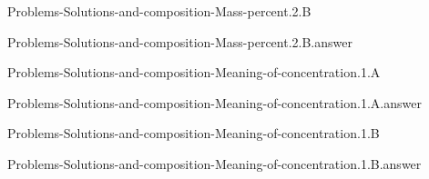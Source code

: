 \documentclass[main.tex]{subfiles}
\newcommand\chapterlabel{}
\begin{document}
\renewcommand\chapterlabel{Ch-electrolytes}
\begin{question}[ID=\the\value{numA}]
{Problems-Solutions-and-composition-Mass-percent.2.B}
\end{question}
   \begin{Form}
   \TextField[multiline,backgroundcolor=gray!20,borderwidth=0,width=0.43\textwidth  ,height=115pt, name=\the\value{numA}]  { }\end{Form}
\begin{solution}
{Problems-Solutions-and-composition-Mass-percent.2.B.answer}
\hspace{0.1cm}
\end{solution}


\renewcommand\chapterlabel{Ch-electrolytes}
\begin{question}[ID=\the\value{numA}]
{Problems-Solutions-and-composition-Meaning-of-concentration.1.A}
\end{question}
   \begin{Form}
   \TextField[multiline,backgroundcolor=gray!20,borderwidth=0,width=0.43\textwidth  ,height=115pt, name=\the\value{numA}]  { }\end{Form}
\begin{solution}
{Problems-Solutions-and-composition-Meaning-of-concentration.1.A.answer}
\hspace{0.1cm}
\end{solution}


\renewcommand\chapterlabel{Ch-electrolytes}
\begin{question}[ID=\the\value{numA}]
{Problems-Solutions-and-composition-Meaning-of-concentration.1.B}
\end{question}
   \begin{Form}
   \TextField[multiline,backgroundcolor=gray!20,borderwidth=0,width=0.43\textwidth  ,height=115pt, name=\the\value{numA}]  { }\end{Form}
\begin{solution}
{Problems-Solutions-and-composition-Meaning-of-concentration.1.B.answer}
\hspace{0.1cm}
\end{solution}
\end{document}
